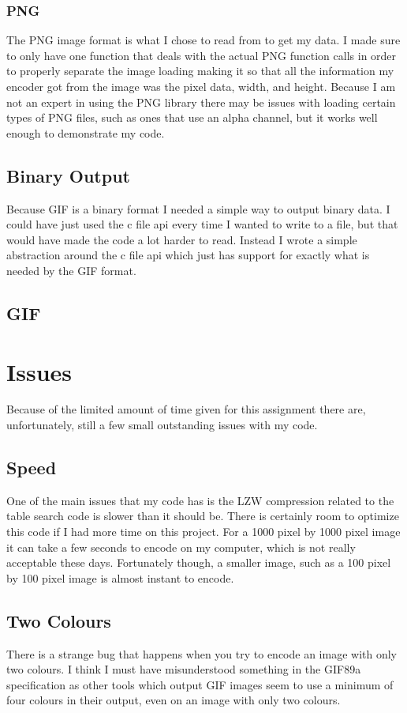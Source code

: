 \documentclass[11pt]{article} %
\begin{document}
\subsubsection{PNG}
The PNG image format is what I chose to read from to get my data. I made sure to only have one function that deals with the actual PNG function calls in order to properly separate the image loading making it so that all the information my encoder got from the image was the pixel data, width, and height. Because I am not an expert in using the PNG library there may be issues with loading certain types of PNG files, such as ones that use an alpha channel, but it works well enough to demonstrate my code.
\subsection{Binary Output}
Because GIF is a binary format I needed a simple way to output binary data. I could have just used the c file api every time I wanted to write to a file, but that would have made the code a lot harder to read. Instead I wrote a simple abstraction around the c file api which just has support for exactly what is needed by the GIF format.
\subsection{GIF}

\section{Issues}
Because of the limited amount of time given for this assignment there are, unfortunately, still a few small outstanding issues with my code.
\subsection{Speed}
One of the main issues that my code has is the LZW compression related to the table search code is slower than it should be. There is certainly room to optimize this code if I had more time on this project. For a 1000 pixel by 1000 pixel image it can take a few seconds to encode on my computer, which is not really acceptable these days. Fortunately though, a smaller image, such as a 100 pixel by 100 pixel image is almost instant to encode.
\subsection{Two Colours}
There is a strange bug that happens when you try to encode an image with only two colours. I think I must have misunderstood something in the GIF89a specification as other tools which output GIF images seem to use a minimum of four colours in their output, even on an image with only two colours.


\end{document}
